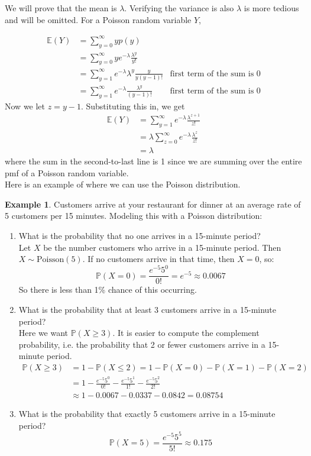 \documentclass[12pt]{article}
\theoremstyle{definition}
\newtheorem*{example}{Example}
\theoremstyle{remark}
\def\P{{\mathbb P}}
\def\E{{\mathbb E}}
\begin{document}
We will prove that the mean is $\lambda$. Verifying the variance is also $\lambda$ is more tedious and will be omitted. For a Poisson random variable $Y$,

\begin{align*}
\E(Y) &= \sum_{y=0}^\infty y p(y) \\
&= \sum_{y=0}^\infty y e^{-\lambda}\frac{\lambda^y}{y!} \\
&= \sum_{y=1}^\infty e^{-\lambda}\lambda^y\frac{y}{y(y-1)!} & \text{first term of the sum is 0} \\
&= \sum_{y=1}^\infty e^{-\lambda} \frac{\lambda^y}{(y-1)!} & \text{first term of the sum is 0}
\end{align*}
Now we let $z = y - 1$. Substituting this in, we get
\begin{align*}
\E(Y) &= \sum_{y=1}^\infty e^{-\lambda} \frac{\lambda^{z+1}}{z!}\\
&= \lambda \sum_{z=0}^\infty e^{-\lambda} \frac{\lambda^{z}}{z!}\\
&= \lambda
\end{align*}
where the sum in the second-to-last line is 1 since we are summing over the entire pmf of a Poisson random variable.\\

Here is an example of where we can use the Poisson distribution.

\begin{example}Customers arrive at your restaurant for dinner at an average rate of 5 customers per 15 minutes. Modeling this with a Poisson distribution:
\begin{enumerate}
\item What is the probability that no one arrives in a 15-minute period?\\

Let $X$ be the number customers who arrive in a 15-minute period. Then $X\sim\text{Poisson}(5)$. If no customers arrive in that time, then $X=0$, so:
\[
\P(X = 0) = \frac{e^{-5}5^0}{0!} = e^{-5} \approx 0.0067
\]
So there is less than 1\% chance of this occurring.

\item What is the probability that at least 3 customers arrive in a 15-minute period?\\

Here we want $\P(X \geq 3)$. It is easier to compute the complement probability, i.e. the probability that 2 or fewer customers arrive in a 15-minute period.
\begin{align*}
\P(X \geq 3) &= 1 - \P(X \leq 2) = 1 - \P(X = 0) - \P(X = 1) - \P(X = 2) \\
&= 1 - \frac{e^{-5}5^0}{0!} - \frac{e^{-5}5^1}{1!} - \frac{e^{-5}5^2}{2!} \\
&\approx 1 - 0.0067 - 0.0337 - 0.0842 = 0.08754
\end{align*}

\item What is the probability that exactly 5 customers arrive in a 15-minute period?\\

\[
\P(X = 5) = \frac{e^{-5}5^5}{5!} \approx 0.175
\]

\end{enumerate}
\end{example}
\end{document}
